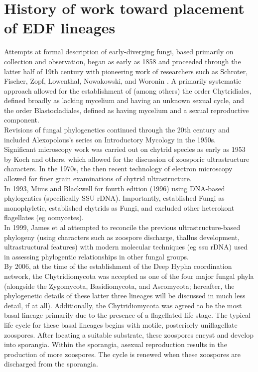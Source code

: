 \section{History of work toward placement of EDF lineages}
Attempts at formal description of early-diverging fungi, based primarily on collection and observation, began as early as 1858 and proceeded through the latter half of 19th century with pioneering work of researchers such as Schroter, Fischer, Zopf, Lowenthal, Nowakowski, and Woronin \cite{lwerPhycomyces}. A primarily systematic approach allowed for the establishment of (among others) the order Chytridiales, defined broadly as lacking mycelium and having an unknown sexual cycle, and the order Blastocladiales, defined as having mycelium and a sexual reproductive component.\\
\indent Revisions of fungal phylogenetics continued through the 20th century and included Alexopolous's series on Introductory Mycology in the 1950s.\\
\indent Significant microscopy work was carried out on chytrid species as early as 1953 by Koch and others, which allowed for the discussion of zoosporic ultrastructure characters. In the 1970s, the then recent technology of electron microscopy allowed for finer grain examinations of chytrid ultrastructure.\\
\indent In 1993, Mims and Blackwell for fourth edition (1996) using DNA-based phylogentics (specifically SSU rDNA). Importantly, established Fungi as monophyletic, established chytrids as Fungi, and excluded other heterokont flagellates (eg oomycetes).\\
\indent In 1999, James et al attempted to reconcile the previous ultrastructure-based phylogeny (using characters such as zoospore discharge, thallus development, ultrastructural features) with modern molecular techniques (eg ssu rDNA) used in assessing phylogentic relationships in other fungal groups.\\
\indent By 2006, at the time of the establishment of the Deep Hypha coordination network, the Chytridiomycota was accepted as one of the four major fungal phyla (alongside the Zygomycota, Basidiomycota, and Ascomycota; hereafter, the phylogenetic details of these latter three lineages will be discussed in much less detail, if at all). Additionally, the Chytridiomycota was agreed to be the most basal lineage primarily due to the presence of a flagellated life stage. The typical life cycle for these basal lineages begins with motile, posteriorly uniflagellate zoospores. After locating a suitable substrate, these zoospores encyst and develop into sporangia. Within the sporangia, asexual reproduction results in the production of more zoospores. The cycle is renewed when these zoospores are discharged from the sporangia.\\
